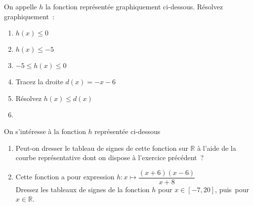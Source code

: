 \exercice On appelle $h$ la fonction représentée graphiquement ci-dessous. Résolvez graphiquement~:\\

\begin{minipage}{0.35\linewidth}
	\begin{enumerate}
		\item $h(x) \leqslant 0$ %
		\item $h(x) \leqslant -5$ %
		\item $-5 \leqslant h(x) \leqslant 0$ %
	\end{enumerate}
\end{minipage}
\begin{minipage}{0.5\linewidth}
	\begin{enumerate}
		\setcounter{enumi}{3}
		\item Tracez la droite $d(x)=-x-6$
		\item Résolvez $h(x) \leqslant d(x)$
		\item[~] ~
	\end{enumerate}
\end{minipage}
\begin{center}
	
\end{center}

\exerciceprime On s'intéresse à la fonction $h$ représentée ci-dessous

\begin{enumerate}
	\item Peut-on dresser le tableau de signes de cette fonction sur $\mathbb{R}$ à l'aide de la courbe représentative dont on dispose à l'exercice précédent~?
	\item Cette fonction a pour expression $h : x \mapsto \dfrac{(x+6)(x-6)}{x+8}$\\
			Dressez les tableaux de signes de la fonction $h$ pour $x \in [-7,20]$, puis~pour~$x \in \mathbb{R}$.
\end{enumerate}